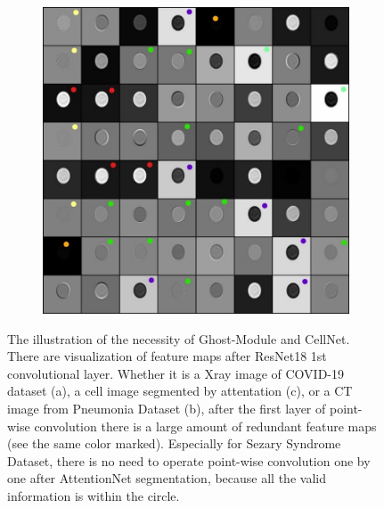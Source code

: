 \begin{figure}[h]
\begin{center}
		\begin{subfigure}[b]{0.49\textwidth}
			\includegraphics[height= 0.25\textheight]{thesis-template-master/images/cellnetnecc3.jpg}
			\caption{}
			\label{fig:cellnet}
		\end{subfigure}
		
	\end{center}
	\caption{The illustration of the necessity of Ghost-Module and CellNet. There are visualization of feature maps after ResNet18\cite{b20} 1st convolutional layer. Whether it is a Xray image of COVID-19 dataset (a), a cell image segmented by attentation (c), or a CT image from Pneumonia Dataset (b), after the first layer of point-wise convolution there is a large amount of redundant feature maps (see the same color marked). Especially for Sezary Syndrome Dataset, there is no need to operate point-wise convolution one by one after AttentionNet segmentation, because all the valid information is within the circle.}
\end{figure}

